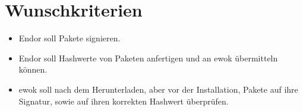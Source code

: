 \section{Wunschkriterien}
\begin{itemize}
	\item Endor soll Pakete signieren.
	\item Endor soll Hashwerte von Paketen anfertigen und an ewok übermitteln können.
	\item ewok soll nach dem Herunterladen, aber vor der Installation, Pakete auf ihre Signatur, sowie auf ihren korrekten Hashwert überprüfen.

\end{itemize}